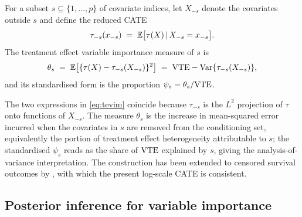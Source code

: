 \begin{definition}
\label{def:tevim}
For a subset $s \subseteq \{1, \dots, p\}$ of covariate indices, let $X_{-s}$
denote the covariates outside $s$ and define the reduced CATE
\[
\tau_{-s}(x_{-s}) \;=\; \mathbb{E}\bigl[\tau(X) \,\vert\, X_{-s} = x_{-s}\bigr].
\]
The treatment effect variable importance measure of $s$ is
\begin{equation}
\label{eq:tevim}
\theta_s \;=\; \mathbb{E}\bigl[\{\tau(X) - \tau_{-s}(X_{-s})\}^2\bigr]
        \;=\; \mathrm{VTE} - \mathrm{Var}\{\tau_{-s}(X_{-s})\},
\end{equation}
and its standardised form is the proportion $\psi_s = \theta_s / \mathrm{VTE}$.
\end{definition}

\noindent
The two expressions in \eqref{eq:tevim} coincide because $\tau_{-s}$ is the
$L^2$ projection of $\tau$ onto functions of $X_{-s}$. The measure $\theta_s$ is
the increase in mean-squared error incurred when the covariates in $s$ are
removed from the conditioning set, equivalently the portion of treatment effect
heterogeneity attributable to $s$; the standardised $\psi_s$ reads as the share
of $\mathrm{VTE}$ explained by $s$, giving the analysis-of-variance interpretation. The
construction has been extended to censored survival outcomes by
\citet{ziersen2024}, with which the present log-scale CATE is consistent.

\subsection{Posterior inference for variable importance}
\label{subsec:vim-posterior}

